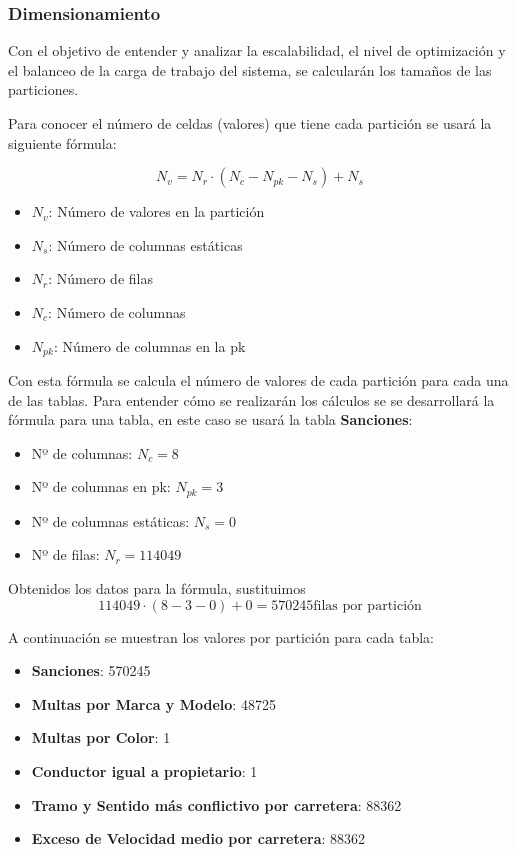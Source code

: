 \documentclass[]{article}
\begin{document}
\subsubsection{Dimensionamiento}
\label{subsubsec:dimensionamiento}
Con el objetivo de entender y analizar la escalabilidad, el nivel de
optimización y el balanceo de la carga de trabajo del sistema, se
calcularán los tamaños de las particiones.

Para conocer el número de celdas (valores) que tiene cada partición se usará la siguiente fórmula:

$$N_v = N_r \cdot (N_c - N_{pk} - N_s) + N_s$$

\begin{itemize}
    \item $N_v$: Número de valores en la partición
    \item $N_s$: Número de columnas estáticas
    \item $N_r$: Número de filas
    \item $N_c$: Número de columnas
    \item $N_{pk}$: Número de columnas en la pk
\end{itemize}

Con esta fórmula se calcula el número de valores de cada partición para cada
una de las tablas. Para entender cómo se realizarán los cálculos se se
desarrollará la fórmula para una tabla, en este caso se usará la tabla
\textbf{Sanciones}:

\begin{itemize}
    \item Nº de columnas: $N_c = 8$
    \item Nº de columnas en pk: $N_{pk} = 3$
    \item Nº de columnas estáticas: $N_s= 0$
    \item Nº de filas: $N_r = 114049$
\end{itemize}

Obtenidos los datos para la fórmula, sustituimos $$114049 \cdot (8 - 3 - 0) + 0 = 570245 \text{filas por partición}$$

A continuación se muestran los valores por partición para cada tabla:
\begin{itemize}
    \item \textbf{Sanciones}: 570245
    \item \textbf{Multas por Marca y Modelo}: 48725
    \item \textbf{Multas por Color}: 1
    \item \textbf{Conductor igual a propietario}: 1
    \item \textbf{Tramo y Sentido más conflictivo por carretera}: 88362
    \item \textbf{Exceso de Velocidad medio por carretera}: 88362
\end{itemize}
\end{document}
